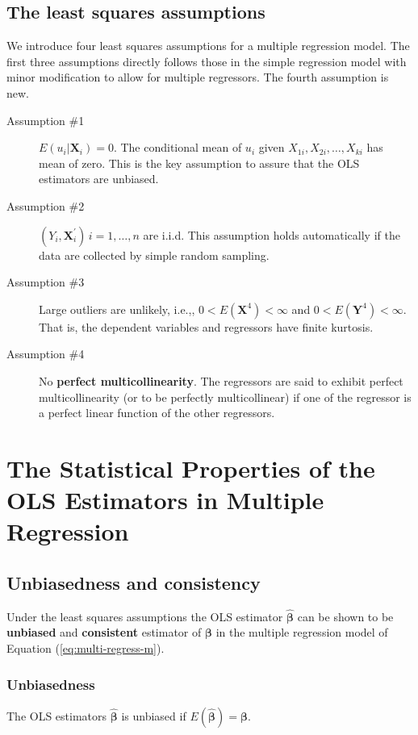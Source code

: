 \documentclass[a4paper,11pt]{article}
\begin{document}
\subsection{The least squares assumptions}
\label{sec:org6b244cc}
We introduce four least squares assumptions for a multiple regression
model. The first three assumptions directly follows those in the
simple regression model with minor modification to allow for multiple
regressors. The fourth assumption is new.

\begin{description}
\item[{Assumption \#1}] \(E(u_i | \mathbf{X}_i) = 0\). The conditional mean
of \(u_i\) given \(X_{1i}, X_{2i}, \ldots, X_{ki}\) has
mean of zero. This is the key assumption to assure
that the OLS estimators are unbiased.

\item[{Assumption \#2}] \((Y_i, \mathbf{X}_i^{\prime})\, i=1, \ldots, n\) are
i.i.d. This assumption holds automatically if the
data are collected by simple random sampling.

\item[{Assumption \#3}] Large outliers are unlikely, i.e.,, \(0 <
                   E(\mathbf{X}^4) < \infty\) and \(0 < E(\mathbf{Y}^4)
                   < \infty\). That is, the dependent variables and
regressors have finite kurtosis.
\item[{Assumption \#4}] No \textbf{perfect multicollinearity}. The regressors are
said to exhibit perfect multicollinearity (or to
be perfectly multicollinear) if one of the
regressor is a perfect linear function of the other
regressors.
\end{description}

\section{The Statistical Properties of the OLS Estimators in Multiple Regression}
\label{sec:org9917666}
\subsection{Unbiasedness and consistency}
\label{sec:orgb67b634}
Under the least squares assumptions the OLS estimator
\(\hat{\boldsymbol{\beta}}\) can be shown to be \textbf{unbiased} and
\textbf{consistent} estimator of \(\boldsymbol{\beta}\) in the multiple
regression model of Equation (\ref{eq:multi-regress-m}).

\subsubsection*{Unbiasedness}
\label{sec:org65fef07}
The OLS estimators \(\hat{\boldsymbol{\beta}}\) is unbiased if
\(E(\hat{\boldsymbol{\beta}}) = \boldsymbol{\beta}\).
\end{document}
